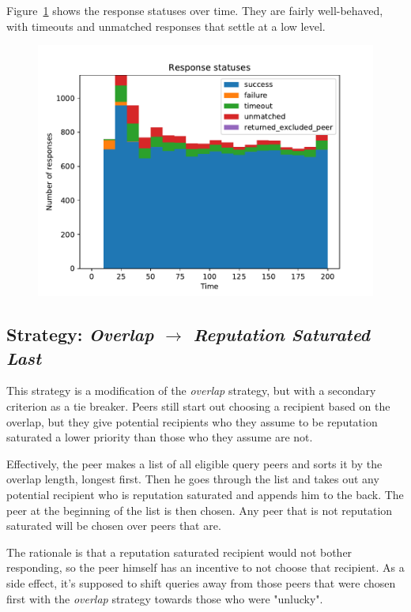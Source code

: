 Figure~\ref{fig:selection_overlap_resp_statuses} shows the response statuses
over time. They are fairly well-behaved, with timeouts and unmatched responses
that settle at a low level.

\begin{figure}[t]
\centering
\includegraphics[width=1\columnwidth]{figures/selection_overlap_resp_statuses}
\label{fig:selection_overlap_resp_statuses}
\end{figure}

\subsection{Strategy: \emph{Overlap $\rightarrow$ Reputation Saturated Last}}
This strategy is a modification of the \emph{overlap} strategy, but with a
secondary criterion as a tie breaker. Peers still start out choosing a recipient
based on the overlap, but they give potential recipients who they assume to be
reputation saturated a lower priority than those who they assume are not.

Effectively, the peer makes a list of all eligible query peers and sorts it by
the overlap length, longest first. Then he goes through the list and takes out
any potential recipient who is reputation saturated and appends him to the back.
The peer at the beginning of the list is then chosen. Any peer that is not
reputation saturated will be chosen over peers that are.

The rationale is that a reputation saturated recipient would not
bother responding, so the peer himself has an incentive to not choose that
recipient. As a side effect, it's supposed to shift queries away from those
peers that were chosen first with the \emph{overlap} strategy towards those who
were "unlucky".

